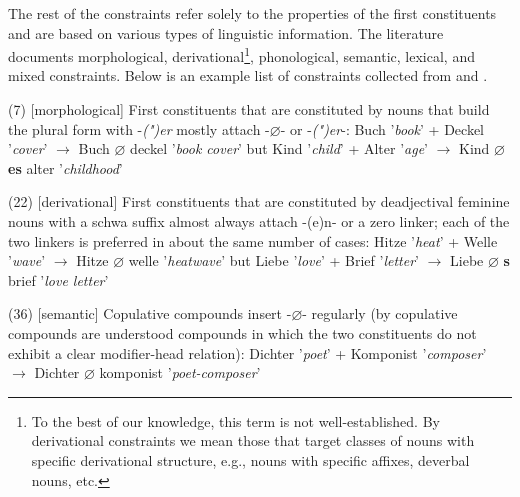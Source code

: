 \documentclass[10pt, a4paper]{article}
\newcommand{\zeroLinker}{\ensuremath{\boldsymbol{\varnothing}}}
\newcommand{\compEx}[7]{%
    #1 '\textit{#2}' + #4 '\textit{#5}'
    $\rightarrow$
    \if\relax\detokenize{#6}\relax
      #1%
    \else
      #6%
    \fi
    \if\relax\detokenize{#3}\relax
      \zeroLinker%
    \else
      \textbf{#3}%
    \fi
    \MakeLowercase{#4} '\textit{#7}'%
}
\begin{document}
The rest of the constraints refer solely to the properties of the first constituents and are based on various types of linguistic information. The literature documents morphological, derivational\footnote{To the best of our knowledge, this term is not well-established. By derivational constraints we mean those that target classes of nouns with specific derivational structure, e.g., nouns with specific affixes, deverbal nouns, etc.}, phonological, semantic, lexical, and mixed constraints. Below is an example list of constraints collected from \citet[227-230]{eisenberg_2013} and \citet[56-57, 83, 89-94, 109]{ortner_mueller-bollhagen_1991}.

\vspace{-0.25em}

\begin{tcolorbox}[breakable, left=0.2em, right=0.2em]

    \vspace{-0.15em}

    (7) [morphological] First constituents that are constituted by nouns that build the plural form with \mbox{-\textit{(")er}} mostly attach \mbox{-{\zeroLinker}-} or \mbox{\mbox{-\textit{(")er}}-}: \compEx{Buch}{book}{}{Deckel}{cover}{}{book cover} but \compEx{Kind}{child}{es}{Alter}{age}{}{childhood}

    \vspace{0.25em}


    (22) [derivational] First constituents that are constituted by deadjectival feminine nouns with a schwa suffix almost always attach -(e)n- or a zero linker; each of the two linkers is preferred in about the same number of cases: \compEx{Hitze}{heat}{}{Welle}{wave}{}{heatwave} but \compEx{Liebe}{love}{s}{Brief}{letter}{}{love letter}
    
    \vspace{0.25em}

    (36) [semantic] Copulative compounds insert \mbox{-{\zeroLinker}-} regularly (by copulative compounds are understood compounds in which the two constituents do not exhibit a clear modifier-head relation): \compEx{Dichter}{poet}{}{Komponist}{composer}{}{poet-composer}

    \vspace{0.25em}


\end{tcolorbox}
\end{document}
